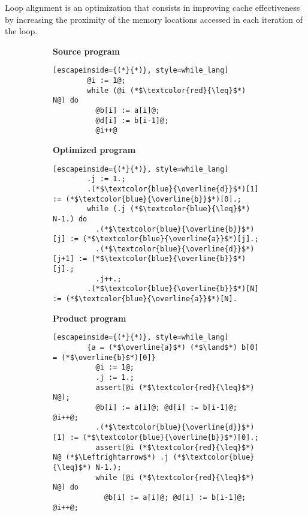 Loop alignment is an optimization that consists in improving cache effectiveness by increasing the proximity of the memory locations accessed in each iteration of the loop.
\begin{figure}
  \centering
  \begin{subfigure}[b]{0.45\textwidth}
    \begin{minipage}[t]{\linewidth}
      \textbf{Source program}
      \begin{lstlisting}[escapeinside={(*}{*)}, style=while_lang]
        @i := 1@; 
        while (@i (*$\textcolor{red}{\leq}$*) N@) do
          @b[i] := a[i]@;
          @d[i] := b[i-1]@;
          @i++@
      \end{lstlisting}
    \end{minipage}
  \end{subfigure}
  \hfill
  \begin{subfigure}[b]{0.45\textwidth}
    \begin{minipage}[t]{\linewidth}
      \textbf{Optimized program}
      \begin{lstlisting}[escapeinside={(*}{*)}, style=while_lang]
        .j := 1.;
        .(*$\textcolor{blue}{\overline{d}}$*)[1] := (*$\textcolor{blue}{\overline{b}}$*)[0].;
        while (.j (*$\textcolor{blue}{\leq}$*) N-1.) do
          .(*$\textcolor{blue}{\overline{b}}$*)[j] := (*$\textcolor{blue}{\overline{a}}$*)[j].;
          .(*$\textcolor{blue}{\overline{d}}$*)[j+1] := (*$\textcolor{blue}{\overline{b}}$*)[j].;
          .j++.;
        .(*$\textcolor{blue}{\overline{b}}$*)[N] := (*$\textcolor{blue}{\overline{a}}$*)[N].
      \end{lstlisting}
    \end{minipage}
  \end{subfigure}
  \hfill
  \begin{subfigure}[b]{0.9\textwidth}
    \begin{minipage}[t]{\linewidth}
      \textbf{Product program}
      \begin{lstlisting}[escapeinside={(*}{*)}, style=while_lang]
        {a = (*$\overline{a}$*) (*$\land$*) b[0] = (*$\overline{b}$*)[0]}
          @i := 1@; 
          .j := 1.;
          assert(@i (*$\textcolor{red}{\leq}$*) N@);
          @b[i] := a[i]@; @d[i] := b[i-1]@; @i++@;
          .(*$\textcolor{blue}{\overline{d}}$*)[1] := (*$\textcolor{blue}{\overline{b}}$*)[0].;
          assert(@i (*$\textcolor{red}{\leq}$*) N@ (*$\Leftrightarrow$*) .j (*$\textcolor{blue}{\leq}$*) N-1.);
          while (@i (*$\textcolor{red}{\leq}$*) N@) do
            @b[i] := a[i]@; @d[i] := b[i-1]@; @i++@;

\end{lstlisting}
\end{minipage}
\end{subfigure}
\end{figure}

